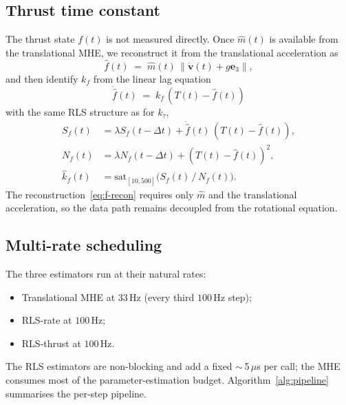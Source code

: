 \documentclass[lettersize,journal]{IEEEtran}
\newcommand{\vect}[1]{\bm{#1}}
\newcommand{\dt}{\Delta t}
\begin{document}
\subsection{Thrust time constant}
The thrust state $f(t)$ is not measured directly.  Once
$\hat m(t)$ is available from the translational MHE, we
reconstruct it from the translational acceleration as
\begin{equation}
\hat f(t) \;=\; \hat m(t)\,\big\|\dot{\vect v}(t)+g\vect e_3\big\|,
\label{eq:f-recon}
\end{equation}
and then identify $k_f$ from the linear lag equation
\begin{equation}
\dot{\hat f}(t) \;=\; k_f\,(T(t)-\hat f(t))
\label{eq:rls-kf-step}
\end{equation}
with the same RLS structure as for $k_\tau$,
\begin{align}
S_f(t) &= \lambda S_f(t-\dt) + \dot{\hat f}(t)\,(T(t)-\hat f(t)), \\
N_f(t) &= \lambda N_f(t-\dt) + (T(t)-\hat f(t))^2, \\
\hat k_f(t) &= \mathrm{sat}_{[10,500]}\big( S_f(t)\,/\,N_f(t) \big).
\end{align}
The reconstruction~\eqref{eq:f-recon} requires only $\hat m$ and
the translational acceleration, so the data path remains
decoupled from the rotational equation.

\subsection{Multi-rate scheduling}
The three estimators run at their natural rates:
\begin{itemize}
\item Translational MHE at $33$\,Hz (every third $100$\,Hz step);
\item RLS-rate at $100$\,Hz;
\item RLS-thrust at $100$\,Hz.
\end{itemize}
The RLS estimators are non-blocking and add a fixed
$\sim$\,5\,$\mu$s per call; the MHE consumes most of the
parameter-estimation budget.  Algorithm~\ref{alg:pipeline}
summarises the per-step pipeline.
\end{document}
